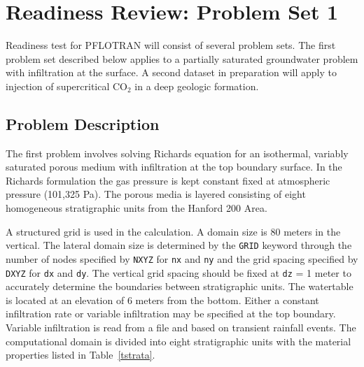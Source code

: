 \documentclass[12pt]{article}
\begin{document}
\section{Readiness Review: Problem Set 1}

Readiness test for PFLOTRAN will consist of several problem sets. The first problem set described below applies to a partially saturated groundwater problem with infiltration at the surface. A second dataset in preparation will apply to injection of supercritical CO$_2$ in a deep geologic formation.

\subsection{Problem Description}

The first problem involves solving Richards equation for an isothermal, variably saturated porous medium with infiltration at the top boundary surface. In the Richards formulation the gas pressure is kept constant fixed at atmospheric pressure (101,325 Pa). The porous media is layered consisting of eight homogeneous stratigraphic units from the Hanford 200 Area.

A structured grid is used in the calculation.
A domain size is 80 meters in the vertical. The lateral domain size is determined by the {\tt GRID} keyword through the number of nodes specified by {\tt NXYZ} for {\tt nx} and {\tt ny} and the grid spacing specified by {\tt DXYZ} for {\tt dx} and {\tt dy}. The vertical grid spacing should be fixed at {\tt dz} = 1 meter to accurately determine the boundaries between stratigraphic units. The watertable is located at an elevation of 6 meters from the bottom. 
Either a constant infiltration rate or variable infiltration may be specified at the top boundary. Variable infiltration is read from a file and based on transient rainfall events.
The computational domain is divided into eight stratigraphic units with the material properties listed in Table~\ref{tstrata}.
\end{document}
